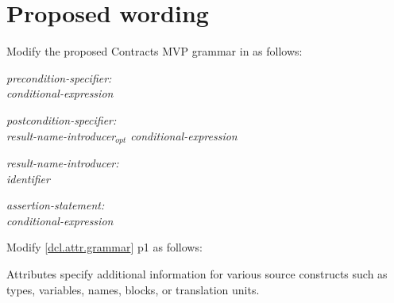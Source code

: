 \section{Proposed wording}

Modify the proposed Contracts MVP grammar in \cite{P2900R5} as follows:

\begin{adjustwidth}{0.5cm}{0.5cm}

\emph{precondition-specifier:} \\
\phantom{~~~}  \tcode{(} \emph{conditional-expression} \tcode{)}

\emph{postcondition-specifier:} \\
\phantom{~~~}  \tcode{(} \emph{result-name-introducer$_{opt}$ conditional-expression} \tcode{)}

\emph{result-name-introducer:} \\
\phantom{~~~}\emph{identifier} \tcode{:}

\emph{assertion-statement:} \\
\phantom{~~~}  \tcode{(} \emph{conditional-expression} \tcode{) ;}

\end{adjustwidth}

\pagebreak %
Modify [\href{https://eel.is/c++draft/dcl.attr.grammar#1.sentence-1}{dcl.attr.grammar}] p1 as follows:

\begin{adjustwidth}{0.5cm}{0.5cm}

Attributes specify additional information for various source constructs such as types, variables, names, blocks, or translation units.

\end{adjustwidth}





\renewcommand{\bibname}{References}




